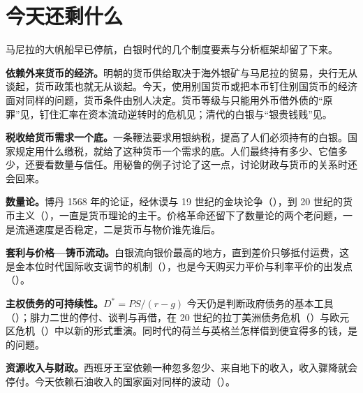 \section{今天还剩什么}\label{sec:silver-legacy}

马尼拉的大帆船早已停航，白银时代的几个制度要素与分析框架却留了下来。

\textbf{依赖外来货币的经济。}明朝的货币供给取决于海外银矿与马尼拉的贸易，央行无从谈起，货币政策也就无从谈起。今天，使用别国货币或把本币钉住别国货币的经济面对同样的问题，货币条件由别人决定。货币等级与只能用外币借外债的“原罪”见，钉住汇率在资本流动逆转时的危机见；清代的白银与“银贵钱贱”见。

\textbf{税收给货币需求一个底。}一条鞭法要求用银纳税，提高了人们必须持有的白银。国家规定用什么缴税，就给了这种货币一个需求的底。人们最终持有多少、它值多少，还要看数量与信任。用秘鲁的例子讨论了这一点，讨论财政与货币的关系时还会回来。

\textbf{数量论。}博丹 1568 年的论证，经休谟与 19 世纪的金块论争（），到 20 世纪的货币主义（），一直是货币理论的主干。价格革命还留下了数量论的两个老问题，一是流通速度是否稳定，二是货币与物价谁先谁后。

\textbf{套利与价格—铸币流动。}白银流向银价最高的地方，直到差价只够抵付运费，这是金本位时代国际收支调节的机制（），也是今天购买力平价与利率平价的出发点（）。

\textbf{主权债务的可持续性。}$D^{*}=PS/(r-g)$ 今天仍是判断政府债务的基本工具（）；腓力二世的停付、谈判与再借，在 20 世纪的拉丁美洲债务危机（）与欧元区危机（）中以新的形式重演。同时代的荷兰与英格兰怎样借到便宜得多的钱，是的问题。

\textbf{资源收入与财政。}西班牙王室依赖一种忽多忽少、来自地下的收入，收入骤降就会停付。今天依赖石油收入的国家面对同样的波动（）。

